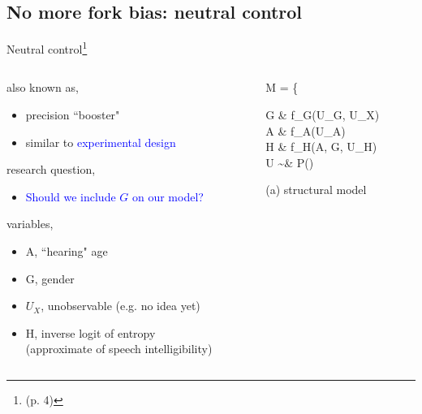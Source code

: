 \subsection{No more fork bias: neutral control}
%
%
\begin{frame}[t, negative]
	\subsectionpage
\end{frame}
%
%
\begin{frame}
	{Neutral control\footnote{\citet{Cinelli_et_al_2021} (p. 4)}}
	\begin{columns}
		\begin{column}{0.5\textwidth}
			also known as,
			\begin{itemize}
				\item precision ``booster"
				\item similar to \textcolor{blue}{experimental design}
			\end{itemize}
			
			research question, 
			\begin{itemize}
				\item \textcolor{blue}{Should we include $G$ on our model?}
			\end{itemize}
			
			variables,
			\begin{itemize}
				\item A, ``hearing" age
				\item G, gender
				\item $U_{X}$, unobservable (e.g. no idea yet)
				\item H, inverse logit of entropy\\
				{\small (approximate of speech intelligibility)}
			\end{itemize}
		\end{column}
		\begin{column}{0.5\textwidth}  
			\begin{equ}
				M = \left\{ \begin{aligned} 
					G \leftarrow & \; f_{G}(U_{G}, U_{X}) \\
					A \leftarrow & \; f_{A}(U_{A}) \\
					H \leftarrow & \; f_{H}(A, G, U_{H}) \\
					U \sim & \; P()
				\end{aligned} \right
				\caption*{(a) structural model}
			\end{equ}
			\begin{figure}
\end{figure}
\end{column}
\end{columns}
\end{frame}
